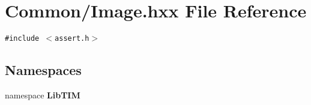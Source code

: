 \section{Common/Image.hxx File Reference}
\label{Image_8hxx}
{\tt \#include $<$assert.h$>$}\par
\subsection*{Namespaces}
\begin{CompactItemize}
\item 
namespace {\bf Lib\-TIM}
\end{CompactItemize}
